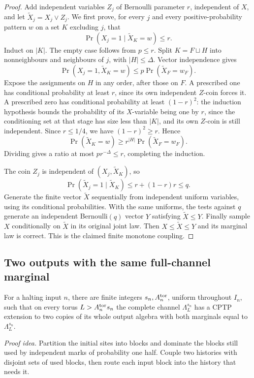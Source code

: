 \begin{proof}
Add independent variables \(Z_j\) of Bernoulli parameter \(r\),
independent of \(X\), and let \(\tilde X_j=X_j\lor Z_j\). We first prove,
for every \(j\) and every positive-probability pattern \(w\) on a
set \(K\) excluding \(j\), that
\begin{equation}\label{f:conditional}
 \Pr(X_j=1\mid \tilde X_K=w)\le r.
\end{equation}
Induct on \(|K|\). The empty case follows from \(p\le r\). Split
\(K=F\sqcup H\) into nonneighbours and neighbours of \(j\), with
\(|H|\le\Delta\). Vector independence gives
\[
 \Pr(X_j=1,\tilde X_K=w)
 \le p\Pr(\tilde X_F=w_F).
\]
Expose the assignments on \(H\) in any order, after those on \(F\).
A prescribed one has conditional probability at least \(r\), since
its own independent \(Z\)-coin forces it. A prescribed zero has
conditional probability at least \((1-r)^2\): the induction
hypothesis bounds the probability of its \(X\)-variable being one
by \(r\), since the conditioning set at that stage has size less
than \(|K|\), and its own \(Z\)-coin is still independent. Since
\(r\le1/4\), we have \((1-r)^2\ge r\). Hence
\[
 \Pr(\tilde X_K=w)\ge r^{|H|}\Pr(\tilde X_F=w_F).
\]
Dividing gives a ratio at most
\(p r^{-\Delta}\le r\), completing the induction.

The coin \(Z_j\) is independent of \((X_j,\tilde X_K)\), so
\[
 \Pr(\tilde X_j=1\mid \tilde X_K)
 \le r+(1-r)r\le q.
\]
Generate the finite vector \(\tilde X\) sequentially from independent
uniform variables, using its conditional probabilities. With the
same uniforms, the tests against \(q\) generate an independent
Bernoulli\((q)\) vector \(Y\) satisfying \(\tilde X\le Y\). Finally sample
\(X\) conditionally on \(\tilde X\) in its original joint law. Then
\(X\le \tilde X\le Y\) and its marginal law is correct. This is the
claimed finite monotone coupling.
\end{proof}

\subsection{Two outputs with the same full-channel marginal}

\begin{proposition}\label{f:extension}
For a halting input \(n\), there are finite integers \(s_n,A^{\rm tor}_n\),
uniform throughout \(I_n\), such that on every torus
\(L>A^{\rm tor}_ns_n\) the complete channel \(\Lambda_L^{s_n}\) has a CPTP
extension to two copies of its whole output algebra with both
marginals equal to \(\Lambda_L^{s_n}\).
\end{proposition}
\par\noindent\emph{Proof idea.} Partition the initial sites into blocks and dominate the blocks still used by independent marks of probability one half. Couple two histories with disjoint sets of used blocks, then route each input block into the history that needs it.

